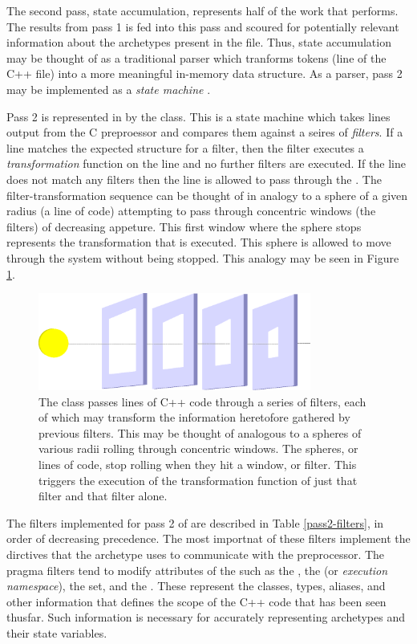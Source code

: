 The second pass, state accumulation, represents half of the work that \cycpp performs.
The results from pass 1 is fed into this pass and scoured for 
potentially relevant information about the archetypes present in the file. 
Thus, state accumulation 
may be thought of as a traditional parser which tranforms tokens (line of the 
C++ file) into a more meaningful in-memory data structure. As a parser, pass 2 
may be implemented as a \emph{state machine} \cite{mertz2003text,wagner2006modeling}.

Pass 2 is represented in \cycpp by the  class.  This is a
state machine which takes lines output from the C preproessor and compares them 
against a seires of \emph{filters}.  If a line matches the expected structure 
for a filter, then the filter executes a \emph{transformation} function on the 
line and no further filters are executed. If the line does not match any filters
then the line is allowed to pass through the . 
The filter-transformation sequence can be thought of in analogy to a sphere of a 
given radius (a line of code) attempting to pass through concentric windows 
(the filters) of decreasing appeture. This first window where the sphere stops 
represents the transformation that is executed.  This sphere is allowed to 
move through the system without being stopped. This analogy may be seen in 
Figure \ref{filter-analogy}.  

\begin{figure}[htbc]
\label{filter-analogy}
\centering
\includegraphics[width=0.8\textwidth]{filter-analogy.eps}
\caption{The  class passes lines of C++ code through 
a series of filters, each of which may transform the information heretofore gathered
by previous filters. 
This may be thought of analogous to a spheres of various radii rolling through 
concentric windows.  The spheres, or lines of code, stop rolling when they hit a  
window, or filter. This triggers the execution of the transformation function of just 
that filter and that filter alone.}
\end{figure}

The filters implemented for pass 2 of \cycpp are described in Table \ref{pass2-filters}, 
in order of decreasing precedence. The most importnat of these filters implement 
the  dirctives that the archetype uses to communicate
with the preprocessor.  The pragma filters tend to modify attributes of
the  such as the , the  
(or \emph{execution namespace}), the  set, and the . 
These represent the classes, types, aliases, and other information that defines
the scope of the C++ code that has been seen thusfar. Such information is necessary 
for accurately representing archetypes and their state variables. 

